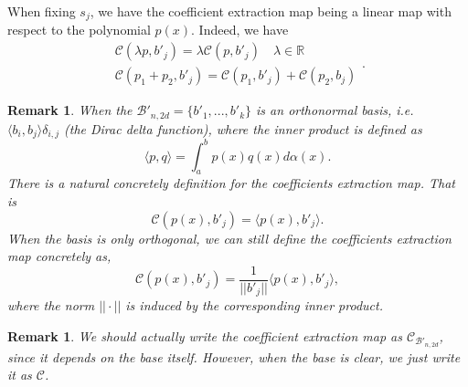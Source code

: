 \documentclass[12pt]{amsart}
\numberwithin{equation}{section}
\newtheorem{remark}[thm]{Remark}
\theoremstyle{definition}
\numberwithin{thm}{section}
\begin{document}
\smallskip
When fixing $s_j$, we have the {coefficient extraction map} being a linear map with respect to the polynomial $p(x)$. Indeed, we have 
\begin{equation*}
     \begin{split}
          \mathcal{C}(\lambda p, b'_j) = \lambda \mathcal{C}(p, b'_j) \quad \lambda \in \mathbb{R}
          \\
          \mathcal{C}(p_1 + p_2, b'_j) = \mathcal{C}(p_1, b'_j) + \mathcal{C}(p_2, b_j)
     \end{split}.
\end{equation*}

\begin{remark}
     When the $\mathcal{B'}_{n, 2d} = \{b'_1,... ,b'_k\}$ is an orthonormal basis, 
     i.e. $\langle b_i, b_j \rangle \delta_{i,j}$ (the Dirac delta function), where the inner product is defined as
     \begin{equation*} 
          \langle p, q \rangle = \int_a^b p(x) q(x) d\alpha(x).
     \end{equation*}
     There is a natural concretely definition for the \emph{coefficients extraction map}. 
     That is
     \begin{equation*}
          \mathcal{C}(p(x), b'_j) = \langle p(x), b'_j \rangle.
     \end{equation*}
     When the basis is only orthogonal, we can still define the \emph{coefficients extraction map} concretely as,
     \begin{equation*}
          \mathcal{C}(p(x), b'_j) = \frac{1}{||b'_j||}\langle p(x), b'_j \rangle, 
     \end{equation*}
     where the norm $|| \cdot ||$ is induced by the corresponding inner product.
\end{remark}

\begin{remark}
     We should actually write the {coefficient extraction map} as $\mathcal{C}_{\mathcal{B'}_{n,2d}}$,
     since it depends on the base itself. However, when the base is clear, we just write it as $\mathcal{C}$.
\end{remark}
\end{document}
